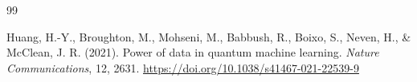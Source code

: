 \begin{thebibliography}{99}

    Huang, H.-Y., Broughton, M., Mohseni, M., Babbush, R., Boixo, S., Neven, H., \& McClean, J. R. (2021). Power of data in quantum machine learning.
    \textit{Nature Communications}, 12, 2631.
    \url{https://doi.org/10.1038/s41467-021-22539-9}

\end{thebibliography}
